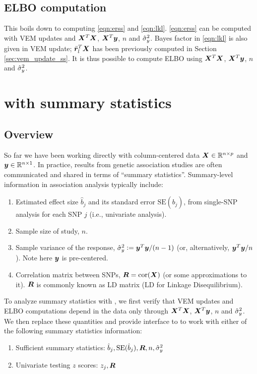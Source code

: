 \subsection{ELBO computation} \label{sec:elbo_ss}
This boils down to computing \eqref{eqn:erss} and \eqref{eqn:lkl}. \eqref{eqn:erss} can be computed with VEM updates and $\bm X^T\bm X$, $\bm X^T\bm y$, $n$ and $\hat{\sigma}_y^2$. Bayes factor in \eqref{eqn:lkl} is also given in VEM update; $\bar{\bm r}_l^T\bm X$ has been previously computed in Section \ref{sec:vem_update_ss}. It is thus possible to compute ELBO using $\bm X^T\bm X$, $\bm X^T\bm y$, $n$ and $\hat{\sigma}_y^2$.


\section{\susie with summary statistics}
\subsection{Overview}
So far we have been working directly with column-centered data $\bm X\in \mathbb{R}^{n\times p}$ and $\bm y\in\mathbb{R}^{n\times 1}$. In practice, results from genetic association studies are often communicated and shared in terms of ``summary statistics''. Summary-level information in association analysis typically include:
\begin{enumerate}
\item Estimated effect size $\hat{b}_j$ and its standard error $\text{SE}(\hat{b}_j)$, from single-SNP analysis for each SNP $j$ (i.e., univariate analysis). 
\item Sample size of study, $n$.
\item Sample variance of the response, $\hat{\sigma}_y^2 := \bm y^T\bm y/(n-1)$ (or, alternatively, $\bm y^T\bm y/n$). Note here $\bm y$ is pre-centered. 
\item Correlation matrix between SNPs, $\bm R=\text{cor}(\bm X)$ (or some approximations to it). $\bm R$ is commonly known as LD matrix (LD for Linkage Disequilibrium).
\end{enumerate}
To analyze summary statistics with \susie, we first verify that \susie VEM updates and ELBO computations depend in the data only through $\bm X^T\bm X$, $\bm X^T\bm y$, $n$ and $\hat{\sigma}_y^2$. We then replace these quantities and provide interface to \susie to work with either of the following summary statistics information:
\begin{enumerate}
    \item Sufficient summary statistics: $\hat{b}_j, \text{SE}(\hat{b}_j), \bm R, n, \hat{\sigma}_y^2$
    \item Univariate testing $z$ scores: $z_j, \bm R$
\end{enumerate}

